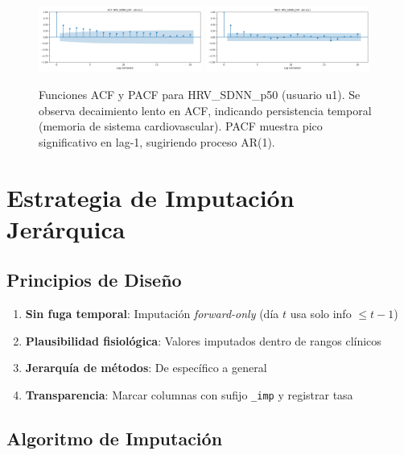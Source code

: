 \documentclass[12pt,letterpaper,twoside]{report}
\begin{document}
\begin{figure}[htbp]
\centering
\includegraphics[width=0.48\textwidth]{../analisis_u/missingness_y_acf/acf_plots/acf_HRV_SDNN_p50_u1.png}
\includegraphics[width=0.48\textwidth]{../analisis_u/missingness_y_acf/pacf_plots/pacf_HRV_SDNN_p50_u1.png}
\caption{Funciones ACF y PACF para HRV\_SDNN\_p50 (usuario u1). Se observa decaimiento lento en ACF, indicando persistencia temporal (memoria de sistema cardiovascular). PACF muestra pico significativo en lag-1, sugiriendo proceso AR(1).}
\label{fig:acf_pacf_hrv_u1}
\end{figure}

\section{Estrategia de Imputación Jerárquica}

\subsection{Principios de Diseño}

\begin{enumerate}[noitemsep]
    \item \textbf{Sin fuga temporal}: Imputación \textit{forward-only} (día $t$ usa solo info $\leq t-1$)
    \item \textbf{Plausibilidad fisiológica}: Valores imputados dentro de rangos clínicos
    \item \textbf{Jerarquía de métodos}: De específico a general
    \item \textbf{Transparencia}: Marcar columnas con sufijo \texttt{\_imp} y registrar tasa
\end{enumerate}

\subsection{Algoritmo de Imputación}
\end{document}

